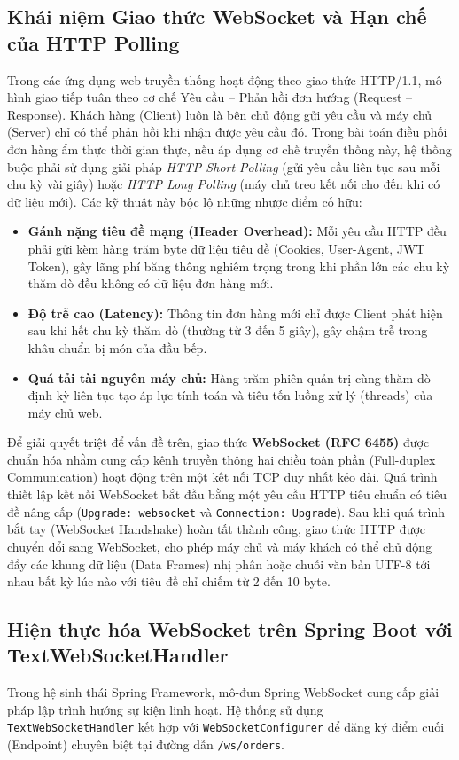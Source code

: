 \documentclass{uetgraduation}
\begin{document}
\subsection{Khái niệm Giao thức WebSocket và Hạn chế của HTTP Polling}
Trong các ứng dụng web truyền thống hoạt động theo giao thức HTTP/1.1, mô hình giao tiếp tuân theo cơ chế Yêu cầu -- Phản hồi đơn hướng (Request -- Response). Khách hàng (Client) luôn là bên chủ động gửi yêu cầu và máy chủ (Server) chỉ có thể phản hồi khi nhận được yêu cầu đó. Trong bài toán điều phối đơn hàng ẩm thực thời gian thực, nếu áp dụng cơ chế truyền thống này, hệ thống buộc phải sử dụng giải pháp \textit{HTTP Short Polling} (gửi yêu cầu liên tục sau mỗi chu kỳ vài giây) hoặc \textit{HTTP Long Polling} (máy chủ treo kết nối cho đến khi có dữ liệu mới). Các kỹ thuật này bộc lộ những nhược điểm cố hữu:
\begin{itemize}
    \item \textbf{Gánh nặng tiêu đề mạng (Header Overhead):} Mỗi yêu cầu HTTP đều phải gửi kèm hàng trăm byte dữ liệu tiêu đề (Cookies, User-Agent, JWT Token), gây lãng phí băng thông nghiêm trọng trong khi phần lớn các chu kỳ thăm dò đều không có dữ liệu đơn hàng mới.
    \item \textbf{Độ trễ cao (Latency):} Thông tin đơn hàng mới chỉ được Client phát hiện sau khi hết chu kỳ thăm dò (thường từ 3 đến 5 giây), gây chậm trễ trong khâu chuẩn bị món của đầu bếp.
    \item \textbf{Quá tải tài nguyên máy chủ:} Hàng trăm phiên quản trị cùng thăm dò định kỳ liên tục tạo áp lực tính toán và tiêu tốn luồng xử lý (threads) của máy chủ web.
\end{itemize}

Để giải quyết triệt để vấn đề trên, giao thức \textbf{WebSocket (RFC 6455)} được chuẩn hóa nhằm cung cấp kênh truyền thông hai chiều toàn phần (Full-duplex Communication) hoạt động trên một kết nối TCP duy nhất kéo dài. Quá trình thiết lập kết nối WebSocket bắt đầu bằng một yêu cầu HTTP tiêu chuẩn có tiêu đề nâng cấp (\texttt{Upgrade: websocket} và \texttt{Connection: Upgrade}). Sau khi quá trình bắt tay (WebSocket Handshake) hoàn tất thành công, giao thức HTTP được chuyển đổi sang WebSocket, cho phép máy chủ và máy khách có thể chủ động đẩy các khung dữ liệu (Data Frames) nhị phân hoặc chuỗi văn bản UTF-8 tới nhau bất kỳ lúc nào với tiêu đề chỉ chiếm từ 2 đến 10 byte.

\subsection{Hiện thực hóa WebSocket trên Spring Boot với TextWebSocketHandler}
Trong hệ sinh thái Spring Framework, mô-đun Spring WebSocket cung cấp giải pháp lập trình hướng sự kiện linh hoạt. Hệ thống sử dụng \texttt{TextWebSocketHandler} kết hợp với \texttt{WebSocketConfigurer} để đăng ký điểm cuối (Endpoint) chuyên biệt tại đường dẫn \texttt{/ws/orders}.
\end{document}
